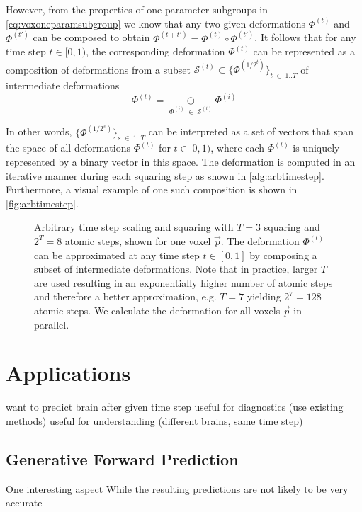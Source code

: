 However, from the properties of one-parameter subgroups in \autoref{eq:voxoneparamsubgroup} we know that any two given deformations $\Phi^{(t)}$ and $\Phi^{(t')}$ can be composed to obtain ${ \Phi^{(t + t')} = \Phi^{(t)} \circ \Phi^{(t')} }$. It follows that for any time step $t \in [0, 1)$, the corresponding deformation $\Phi^{(t)}$ can be represented as a composition of deformations from a subset $\mathcal{S}^{(t)} \subset \{ \Phi^{(1 / 2^{t})} \}_{t \; \in \; 1 .. T} $ of intermediate deformations
\begin{equation}
	\Phi^{(t)} = \underset{\Phi^{(i)} \; \in \; \mathcal{S}^{(t)}}{\bigcirc} \Phi^{(i)}
\end{equation}

In other words, $\{ \Phi^{(1 / 2^{s})} \}_{s \; \in \; 1 .. T}$ can be interpreted as a set of vectors that span the space of all deformations $\Phi^{(t)}$ for $t \in [0, 1)$, where each $\Phi^{(t)}$ is uniquely represented by a binary vector in this space. The deformation is computed in an iterative manner during each squaring step as shown in \autoref{alg:arbtimestep}. Furthermore, a visual example of one such composition is shown in \autoref{fig:arbtimestep}.



\begin{figure}
	\centering
	
	\caption{Arbitrary time step scaling and squaring with $T = 3$ squaring and $ 2^T = 8 $ atomic steps, shown for one voxel $ \vec p $. The deformation $ \Phi^{(t)} $ can be approximated at any time step $ t \in [0, 1] $ by composing a subset of intermediate deformations. Note that in practice, larger $T$ are used resulting in an exponentially higher number of atomic steps and therefore a better approximation, e.g. $T = 7$ yielding $ 2^7 = 128 $ atomic steps. We calculate the deformation for all voxels $ \vec{p} $ in parallel.} \label{fig:arbtimestep}
\end{figure}

\chapter{Applications}



want to predict brain after given time step
useful for diagnostics (use existing methods)
useful for understanding (different brains, same time step)

\section{Generative Forward Prediction}
One interesting aspect
While the resulting predictions are not likely to be very accurate

